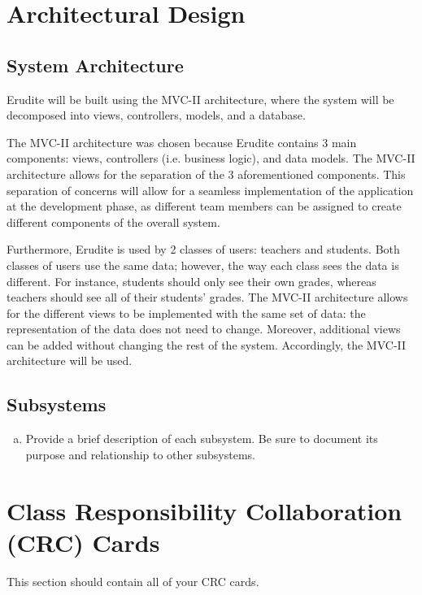\documentclass[]{article}
\begin{document}
\section{Architectural Design}
\label{sec:architectural_design}

\subsection{System Architecture}
\label{sub:system_architecture}
Erudite will be built using the MVC-II architecture, where the system will be decomposed into views, controllers, models, and a database.

The MVC-II architecture was chosen because Erudite contains 3 main components: views, controllers (i.e. business logic), and data models. The MVC-II architecture allows for the separation of the 3 aforementioned components. This separation of concerns will allow for a seamless implementation of the application at the development phase, as different team members can be assigned to create different components of the overall system.

Furthermore, Erudite is used by 2 classes of users: teachers and students. Both classes of users use the same data; however, the way each class sees the data is different. For instance, students should only see their own grades, whereas teachers should see all of their students' grades. The MVC-II architecture allows for the different views to be implemented with the same set of data: the representation of the data does not need to change.  Moreover, additional views can be added without changing the rest of the system. Accordingly, the MVC-II architecture will be used.


\subsection{Subsystems}
\label{sub:subsystems}
\begin{enumerate}[a)]
	\item Provide a brief description of each subsystem. Be sure to document its
purpose and relationship to other subsystems.
\end{enumerate}


\section{Class Responsibility Collaboration (CRC) Cards}
\label{sec:class_responsibility_collaboration_crc_cards}
This section should contain all of your CRC cards.
\end{document}
